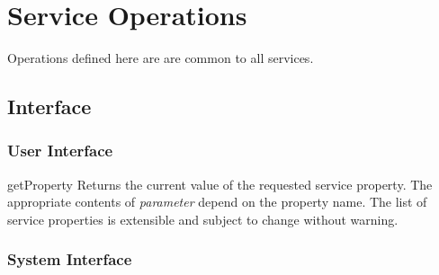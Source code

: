 \section{Service Operations}\label{sec:Service}

Operations defined here are are common to all services.

\subsection{Interface}

\subsubsection{User Interface}

\begin{method}{getProperty}
\desc Returns the current value of the requested service property. The appropriate
contents of \textit{parameter} depend on the property name. The list of
service properties is extensible and subject to change without warning.
\end{method}

\subsubsection{System Interface}
